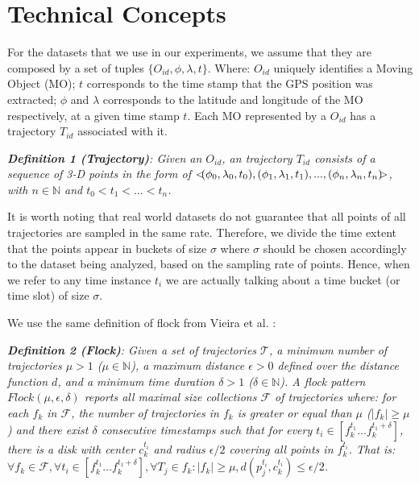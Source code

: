 \chapter{Technical Concepts}
\label{chp:techconcepts}
For the datasets that we use in our experiments, we assume that they are composed by a set of tuples $\{O_{id}, \phi,
\lambda, t\}$.  Where: $O_{id}$ uniquely identifies a Moving Object (MO); $t$ corresponds to the time stamp that the GPS
position was extracted; $\phi$ and $\lambda$ corresponds to the latitude and longitude of the MO respectively, at a
given time stamp $t$. Each MO represented by a $O_{id}$ has a trajectory $T_{id}$ associated with it.

\noindent
\textit{\textbf{Definition 1 (Trajectory)}: Given an $O_{id}$, an trajectory $T_{id}$ consists of a sequence of 3-D
points in the form of $<\hspace{-0.2cm}(\phi_0, \lambda_0, t_0), (\phi_1, \lambda_1, t_1), ..., (\phi_n, \lambda_n, t_n)
\hspace{-0.2cm}>$, with $n \in \mathbb{N}$ and $t_0 < t_1 < ... < t_n$.}

It is worth noting that real world datasets do not guarantee that all points of all trajectories are sampled in the same
rate. Therefore, we divide the time extent that the points appear in buckets of size $\sigma$ where $\sigma$ should be
chosen accordingly to the dataset being analyzed, based on the sampling rate of points. Hence, when we refer to any time
instance $t_i$ we are actually talking about a time bucket (or time slot) of size $\sigma$.

We use the same definition of flock from Vieira et al. \cite{bib:vieira}:

\noindent
\textit{\textbf{Definition 2 (Flock)}: Given a set of trajectories $\mathcal{T}$, a minimum number of trajectories $\mu
> 1$ ($\mu \in \mathbb{N}$), a maximum distance $\epsilon > 0$ defined over the distance function $d$, and a minimum
time duration $\delta > 1$ ($\delta \in \mathbb{N}$). A flock pattern $Flock (\mu, \epsilon, \delta)$ reports all
maximal size collections $\mathcal{F}$ of trajectories where: for each $f_k$ in $\mathcal{F}$, the number of
trajectories in $f_k$ is greater or equal than $\mu$ ($|f_k| \ge \mu$) and there exist $\delta$ consecutive timestamps
such that for every $t_i \in [f_k^{t_1}...f_k^{t_1 + \delta}]$, there is a disk with center $c_k^{t_i}$ and radius
$\epsilon/2$ covering all points in $f_k^{t_i}$. That is: $\forall f_k \in \mathcal{F}, \forall t_i \in
[f_k^{t_1}...f_k^{t_1 + \delta}], \forall T_j \in f_k: |f_k | \ge \mu, d(p_j^{t_i},c_k^{t_i}) \le \epsilon/2$.}

